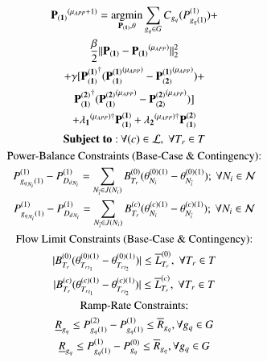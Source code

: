 \documentclass[preprint,12pt,3p]{elsarticle}
\begin{document}
\begin{subequations}\label{Look-Ahead_General_First_Interval_Angle}
\begin{gather}
\mathbf{P_{(1)}}^{(\mu_{APP}+1)}=\argmin_{\mathbf{P_{(1)}},\theta} \sum_{{g_q}\in G}C_{g_q}(P_{{g_q}(1)}^{(1)})+\notag\\\frac{\beta}{2}||\mathbf{P_{(1)}}-\mathbf{P_{(1)}}^{(\mu_{APP})}||_2^2\notag\\+\gamma[\mathbf{P_{(1)}^{(1)}}^{\dagger}(\mathbf{P_{(1)}^{(1)}}^{(\mu_{APP})}-\mathbf{P_{(2)}^{(1)}}^{(\mu_{APP})})+\notag\\\mathbf{P_{(1)}^{(2)}}^{\dagger}(\mathbf{P_{(1)}^{(2)}}^{(\mu_{APP})}-\mathbf{P_{(2)}^{(2)}}^{(\mu_{APP})})]\notag\\+\mathbf{\lambda_1}^{(\mu_{APP})\dagger}\mathbf{P_{(1)}^{(1)}}+\mathbf{\lambda_2}^{(\mu_{APP})\dagger}\mathbf{P_{(1)}^{(2)}}\label{first_Look-Ahead_General_First_Interval_Angle}\\
\mathbf{Subject\;to:}\:\forall(c)\in\mathcal{L},\;\forall T_r\in T\notag\\
\text{Power-Balance Constraints (Base-Case \& Contingency):}\notag\\
P_{{g_q}_{N_i}(1)}^{(1)}-P_{{D_d}_{N_i}}^{(1)}=\sum_{N_{\overline{i}}\in{J(N_i)}}B_{T_r}^{(0)}(\theta_{N_i}^{(0)(1)}-\theta_{N_{\overline{i}}}^{(0)(1)});\ \forall{{N_i}\in\mathcal{N}}
\label{second_Look-Ahead_General_First_Interval_Angle}\\
P_{{g_q}_{N_i}(1)}^{(1)}-P_{{D_d}_{N_i}}^{(1)}=\sum_{N_{\overline{i}}\in{J(N_i)}}B_{T_r}^{(c)}(\theta_{N_i}^{(c)(1)}-\theta_{N_{\overline{i}}}^{(c)(1)});\ \forall{{N_i}\in\mathcal{N}}\label{secondA_Look-Ahead_General_First_Interval_Angle}\\
\text{Flow Limit Constraints (Base-Case \& Contingency):}\notag\\
|B_{T_r}^{(0)}(\theta_{{T_r}_{t_1}}^{(0)(1)}-\theta_{{T_r}_{t_2}}^{(0)(1)})|\leq{{\overline{L}}_{T_r}^{(0)}},\;\forall{T_r\in{T}}\label{third_Look-Ahead_General_First_Interval_Angle}\\
|B_{T_r}^{(c)}(\theta_{{T_r}_{t_1}}^{(c)(1)}-\theta_{{T_r}_{t_2}}^{(c)(1)})|\leq{{\overline{L}}_{T_r}^{(c)}},\;\forall{T_r\in{T}}\label{third1_Look-Ahead_General_First_Interval_Angle}\\
\text{Ramp-Rate Constraints:}\notag\\
\underline{R}_{g_q}\leq P_{{g_q}(1)}^{(2)}-P_{{g_q}(1)}^{(1)}\leq \overline{R}_{g_q},\forall {g_q}\in G\label{fourth_Look-Ahead_General_First_Interval_Angle}\\
\underline{R}_{g_q}\leq P_{{g_q}(1)}^{(1)}-P_{g_q}^{(0)}\leq \overline{R}_{g_q},\forall {g_q}\in G\label{fifth_Look-Ahead_General_First_Interval_Angle}
\end{gather}
\end{subequations}
\end{document}
